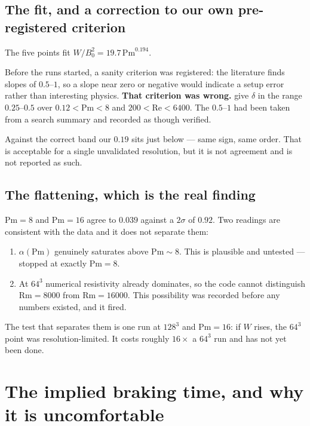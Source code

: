 \documentclass[11pt,a4paper]{article}
\newcommand{\Pm}{\mathrm{Pm}}
\newcommand{\Rm}{\mathrm{Rm}}
\newcommand{\Rey}{\mathrm{Re}}
\begin{document}
\subsection{The fit, and a correction to our own pre-registered criterion}

The five points fit $W/B_0^2 = 19.7\,\Pm^{0.194}$.

Before the runs started, a sanity criterion was registered: the literature finds
slopes of $0.5$--$1$, so a slope near zero or negative would indicate a setup
error rather than interesting physics. \textbf{That criterion was wrong.}
\citet{lesur2007} give $\delta$ in the range $0.25$--$0.5$ over
$0.12 < \Pm < 8$ and $200 < \Rey < 6400$. The $0.5$--$1$ had been taken from a
search summary and recorded as though verified.

Against the correct band our $0.19$ sits just below --- same sign, same order.
That is acceptable for a single unvalidated resolution, but it is not agreement
and is not reported as such.

\subsection{The flattening, which is the real finding}

$\Pm = 8$ and $\Pm = 16$ agree to $0.039$ against a $2\sigma$ of $0.92$. Two
readings are consistent with the data and it does not separate them:

\begin{enumerate}\itemsep2pt
\item $\alpha(\Pm)$ genuinely saturates above $\Pm \sim 8$. This is plausible
      and untested --- \citet{lesur2007} stopped at exactly $\Pm = 8$.
\item At $64^3$ numerical resistivity already dominates, so the code cannot
      distinguish $\Rm = 8000$ from $\Rm = 16000$. This possibility was recorded
      before any numbers existed, and it fired.
\end{enumerate}

The test that separates them is one run at $128^3$ and $\Pm = 16$: if $W$ rises,
the $64^3$ point was resolution-limited. It costs roughly $16\times$ a $64^3$
run and has not yet been done.

\section{The implied braking time, and why it is uncomfortable}
\end{document}
